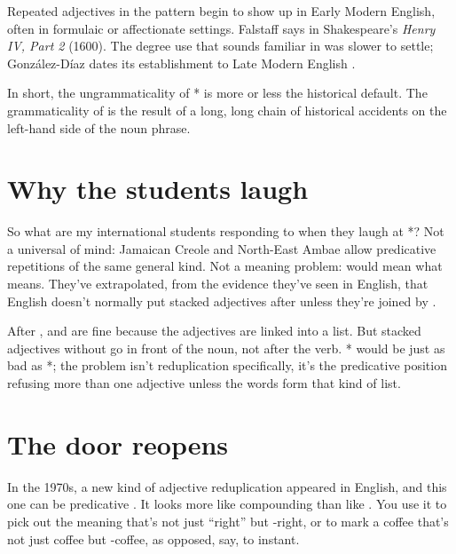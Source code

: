 Repeated adjectives in the  pattern begin to show up in Early Modern English, often in formulaic or affectionate settings. Falstaff says  in Shakespeare's \textit{Henry IV, Part 2} (1600). The degree use that sounds familiar in  was slower to settle; González-Díaz dates its establishment to Late Modern English \citep{Gonzalez-Diaz2018}.

In short, the ungrammaticality of * is more or less the historical default. The grammaticality of  is the result of a long, long chain of historical accidents on the left-hand side of the noun phrase.

\section{Why the students laugh}

So what are my international students responding to when they laugh at
*? Not a universal of mind: Jamaican Creole
and North-East Ambae allow predicative repetitions of the same general
kind. Not a meaning problem:  would mean what  means. They've extrapolated, from the evidence they've seen in
English, that English doesn't normally put stacked adjectives after
 unless they're joined by .

After ,  and  are fine because the adjectives are linked into
a list. But stacked adjectives without  go in front of the
noun, not after the verb. * would be just
as bad as *; the problem isn't reduplication
specifically, it's the predicative position refusing more than one
adjective unless the words form that kind of list.

\section{The door reopens}

In the 1970s, a new kind of adjective reduplication appeared in English, and this one can be predicative \citep{Gonzalez-Diaz2018}. It looks more like compounding than like . You use it to pick out the meaning that's not just \enquote{right} but -right, or to mark a coffee that's not just coffee but -coffee, as opposed, say, to instant.

